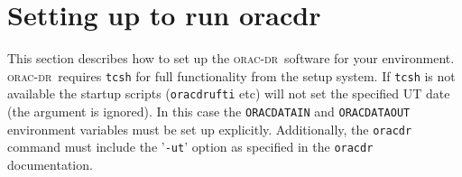 \documentclass[twoside,11pt]{article}
\renewcommand{\_}{\texttt{\symbol{95}}}
\newcommand{\oracdr}{\textsc{orac-dr}}
\begin{document}
\section{Setting up to run oracdr\label{Setting_up_to_run_oracdr}}

This section describes how to set up the \oracdr\ software for your
environment. \oracdr\ requires \texttt{tcsh} for full functionality from the
setup system. If \texttt{tcsh} is not available the startup scripts
(\texttt{oracdr\_ufti} etc) will not set the specified UT date (the argument
is ignored). In this case the \texttt{ORAC\_DATA\_IN} and \texttt{ORAC\_DATA\_OUT}
environment variables must be set up explicitly. Additionally, the
\texttt{oracdr} command must include the '\texttt{-ut}' option as specified in the
\texttt{oracdr} documentation.
\end{document}
